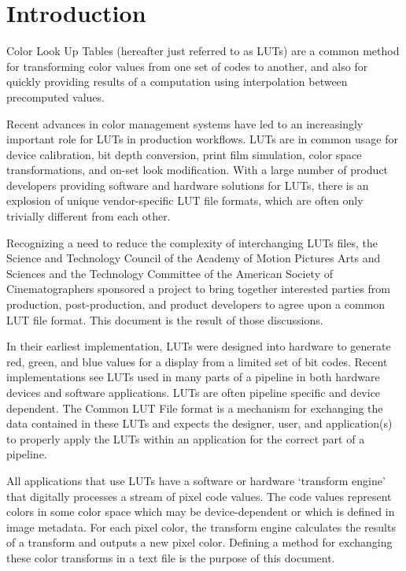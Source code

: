\unnumberedformat	    %
\chapter{Introduction} 	%

Color Look Up Tables (hereafter just referred to as LUTs) are a common method for transforming color values from one set of codes to another, and also for quickly providing results of a computation using interpolation between precomputed values.  

Recent advances in color management systems have led to an increasingly important role for LUTs in production workflows.  LUTs are in common usage for device calibration, bit depth conversion, print film simulation, color space transformations, and on-set look modification. With a large number of product developers providing software and hardware solutions for LUTs, there is an explosion of unique vendor-specific LUT file formats, which are often only trivially different from each other.

Recognizing a need to reduce the complexity of interchanging LUTs files, the Science and Technology Council of the Academy of Motion Pictures Arts and Sciences and the Technology Committee of the American Society of Cinematographers sponsored a project to bring together interested parties from production, post-production, and product developers to agree upon a common LUT file format.  This document is the result of those discussions.

In their earliest implementation, LUTs were designed into hardware to generate red, green, and blue values for a display from a limited set of bit codes.  Recent implementations see LUTs used in many parts of a pipeline in both hardware devices and software applications.  LUTs are often pipeline specific and device dependent.  The Common LUT File format is a mechanism for exchanging the data contained in these LUTs and expects the designer, user, and application(s) to properly apply the LUTs within an application for the correct part of a pipeline.

All applications that use LUTs have a software or hardware ‘transform engine’ that digitally processes a stream of pixel code values.  The code values represent colors in some color space which may be device-dependent or which is defined in image metadata.  For each pixel color, the transform engine calculates the results of a transform and outputs a new pixel color.  Defining a method for exchanging these color transforms in a text file is the purpose of this document.

